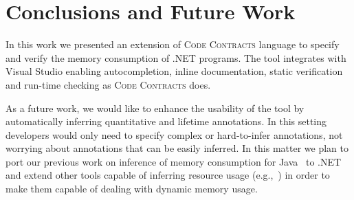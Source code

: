\section{Conclusions and Future Work} \label{sec:conclusions}
In this work we presented an extension of  \textsc{Code Contracts} language to specify and verify the memory consumption of .NET programs. %
The tool integrates with Visual Studio enabling autocompletion, inline documentation, static verification and run-time checking as \textsc{Code Contracts} does. 

As a future work, we would like to enhance the usability of the tool by automatically inferring quantitative and lifetime annotations.
In this setting developers would only need to specify complex or hard-to-infer annotations, not worrying about annotations that can be easily inferred. In this matter we plan to port our previous work on inference of memory consumption for Java~\cite{garber08ismm} to .NET and extend other tools capable of inferring resource usage (e.g.,~\cite{gulwani2010reachability}) in order to make them capable of dealing with dynamic memory usage.
